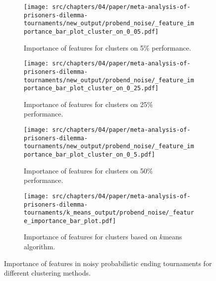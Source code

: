 \begin{figure}[!htbp]
    \begin{subfigure}[t]{0.5\textwidth}
        \begin{center}
            \texttt{[image: src/chapters/04/paper/meta-analysis-of-prisoners-dilemma-tournaments/new\_output/probend\_noise/\_feature\_importance\_bar\_plot\_cluster\_on\_0\_05.pdf]}
        \end{center}
        \caption{Importance of features for clusters on 5\% performance.}
    \end{subfigure}
    \begin{subfigure}[t]{0.5\textwidth}
        \begin{center}
            \texttt{[image: src/chapters/04/paper/meta-analysis-of-prisoners-dilemma-tournaments/new\_output/probend\_noise/\_feature\_importance\_bar\_plot\_cluster\_on\_0\_25.pdf]}
        \end{center}
        \caption{Importance of features for clusters on 25\% performance.}
    \end{subfigure}
    \begin{subfigure}[t]{0.5\textwidth}
        \begin{center}
            \texttt{[image: src/chapters/04/paper/meta-analysis-of-prisoners-dilemma-tournaments/new\_output/probend\_noise/\_feature\_importance\_bar\_plot\_cluster\_on\_0\_5.pdf]}
        \end{center}
        \caption{Importance of features for clusters on 50\% performance.}
    \end{subfigure}
    \begin{subfigure}[t]{0.5\textwidth}
        \begin{center}
            \texttt{[image: src/chapters/04/paper/meta-analysis-of-prisoners-dilemma-tournaments/k\_means\_output/probend\_noise/\_feature\_importance\_bar\_plot.pdf]}
        \end{center}
        \caption{Importance of features for clusters based on \(k\)means algorithm.}
    \end{subfigure}
    \caption{Importance of features in noisy probabilistic ending tournaments for different
    clustering methods.}\label{fig:clustering_importance_probend_noise}
\end{figure}

